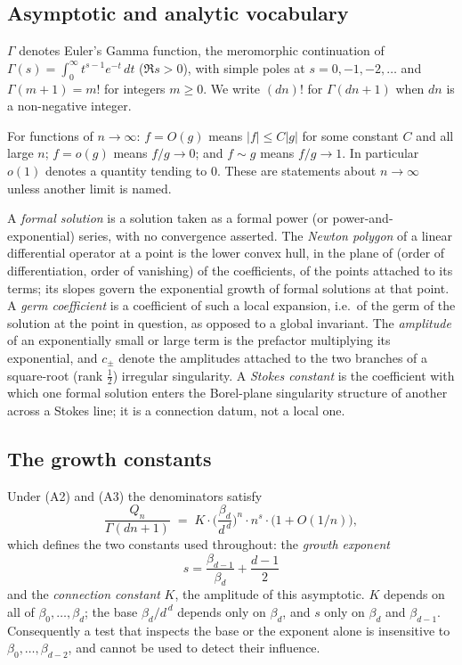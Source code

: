\subsection{Asymptotic and analytic vocabulary}\label{ssec:asymptotic}

$\Gamma$ denotes Euler's Gamma function, the meromorphic continuation of
$\Gamma(s)=\int_0^\infty t^{s-1}e^{-t}\,dt$ ($\Re s>0$), with simple poles at
$s=0,-1,-2,\dots$ and $\Gamma(m+1)=m!$ for integers $m\ge0$. We write $(dn)!$
for $\Gamma(dn+1)$ when $dn$ is a non-negative integer.

For functions of $n\to\infty$: $f=O(g)$ means $|f|\le C|g|$ for some constant
$C$ and all large $n$; $f=o(g)$ means $f/g\to0$; and $f\sim g$ means
$f/g\to1$. In particular $o(1)$ denotes a quantity tending to $0$. These are
statements about $n\to\infty$ unless another limit is named.

A \emph{formal solution} is a solution taken as a formal power (or
power-and-exponential) series, with no convergence asserted. The
\emph{Newton polygon} of a linear differential operator at a point is the lower
convex hull, in the plane of (order of differentiation, order of vanishing) of
the coefficients, of the points attached to its terms; its slopes govern the
exponential growth of formal solutions at that point. A \emph{germ
coefficient} is a coefficient of such a local expansion, i.e.\ of the germ of
the solution at the point in question, as opposed to a global invariant. The
\emph{amplitude} of an exponentially small or large term is the prefactor
multiplying its exponential, and $c_\pm$ denote the amplitudes attached to the
two branches of a square-root (rank $\tfrac12$) irregular singularity. A
\emph{Stokes constant} is the coefficient with which one formal solution enters
the Borel-plane singularity structure of another across a Stokes line; it is a
connection datum, not a local one.

\subsection{The growth constants}\label{ssec:growth}

Under (A2) and (A3) the denominators satisfy
\[
  \frac{Q_n}{\Gamma(dn+1)}\;=\;K\cdot\Big(\frac{\beta_d}{d^{\,d}}\Big)^{n}
  \cdot n^{s}\cdot\bigl(1+O(1/n)\bigr) ,
\]
which defines the two constants used throughout: the \emph{growth exponent}
\[
  s=\frac{\beta_{d-1}}{\beta_d}+\frac{d-1}{2}
\]
and the \emph{connection constant} $K$, the amplitude of this asymptotic. $K$
depends on all of $\beta_0,\dots,\beta_d$; the base $\beta_d/d^{\,d}$ depends
only on $\beta_d$, and $s$ only on $\beta_d$ and $\beta_{d-1}$. Consequently a
test that inspects the base or the exponent alone is insensitive to
$\beta_0,\dots,\beta_{d-2}$, and cannot be used to detect their influence.

